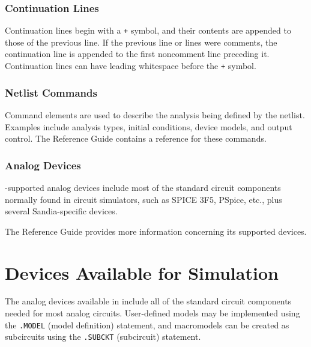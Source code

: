 


\subsubsection{Continuation Lines}
Continuation lines begin with a \verb|+| symbol, and their contents are appended to those of the previous line.  If the previous line or lines were comments, the continuation line is
appended to the first noncomment line preceding it.  Continuation lines can have leading whitespace before the \verb|+| symbol.

\subsubsection{Netlist Commands}
Command elements are used to describe the
analysis being defined by the netlist.  Examples include analysis types,
initial conditions, device models, and output control.
The \Xyce{} Reference Guide\ReferenceGuide{} contains a reference for these commands.


\subsubsection{Analog Devices}
\Xyce{}-supported analog devices
include most of the standard circuit components normally found in circuit
simulators, such as SPICE 3F5, PSpice, etc., plus several Sandia-specific
devices.


The \Xyce{} Reference Guide\ReferenceGuide{} provides more information concerning its supported devices.

\section{Devices Available for Simulation}
\label{Available_Devices}

The analog devices available in \Xyce{} include all of the standard circuit
components needed for most analog circuits.  User-defined models may be
implemented using the 
\texttt{.MODEL} (model definition) statement, and macromodels can be created as
subcircuits using the 
\texttt{.SUBCKT} (subcircuit) statement.

